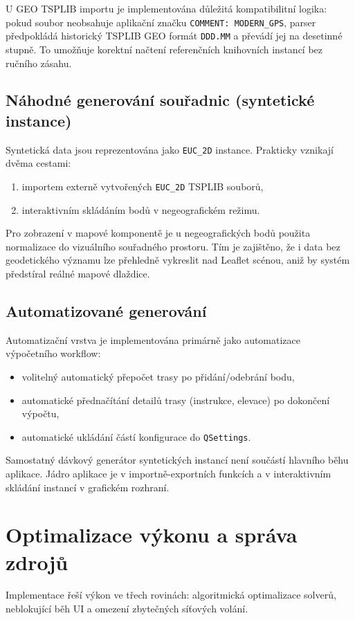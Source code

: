 U GEO TSPLIB importu je implementována důležitá kompatibilitní logika: pokud soubor neobsahuje aplikační značku \texttt{COMMENT: MODERN\_GPS}, parser předpokládá historický TSPLIB GEO formát \texttt{DDD.MM} a převádí jej na desetinné stupně. To umožňuje korektní načtení referenčních knihovních instancí bez ručního zásahu.

\subsection{Náhodné generování souřadnic (syntetické instance)}
Syntetická data jsou reprezentována jako \texttt{EUC\_2D} instance. Prakticky vznikají dvěma cestami:
\begin{enumerate}
    \item importem externě vytvořených \texttt{EUC\_2D} TSPLIB souborů,
    \item interaktivním skládáním bodů v negeografickém režimu.
\end{enumerate}

Pro zobrazení v mapové komponentě je u negeografických bodů použita normalizace do vizuálního souřadného prostoru. Tím je zajištěno, že i data bez geodetického významu lze přehledně vykreslit nad Leaflet scénou, aniž by systém předstíral reálné mapové dlaždice.

\subsection{Automatizované generování}
Automatizační vrstva je implementována primárně jako automatizace výpočetního workflow:
\begin{itemize}
    \item volitelný automatický přepočet trasy po přidání/odebrání bodu,
    \item automatické přednačítání detailů trasy (instrukce, elevace) po dokončení výpočtu,
    \item automatické ukládání částí konfigurace do \texttt{QSettings}.
\end{itemize}

Samostatný dávkový generátor syntetických instancí není součástí hlavního běhu aplikace. Jádro aplikace je v importně-exportních funkcích a v interaktivním skládání instancí v grafickém rozhraní.

\section{Optimalizace výkonu a správa zdrojů}
\label{sec:implementace_vykonu}
Implementace řeší výkon ve třech rovinách: algoritmická optimalizace solverů, neblokující běh UI a omezení zbytečných síťových volání.

